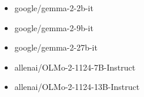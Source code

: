 \begin{itemize}
    \item google/gemma-2-2b-it~\cite{team2024gemma}
    \item google/gemma-2-9b-it~\cite{team2024gemma}
    \item google/gemma-2-27b-it~\cite{team2024gemma}

    \item allenai/OLMo-2-1124-7B-Instruct~\cite{olmo20242}
    \item allenai/OLMo-2-1124-13B-Instruct~\cite{olmo20242}

\end{itemize}






